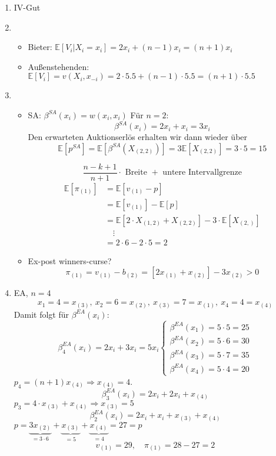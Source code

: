 \documentclass[12pt]{extreport} %
\theoremstyle{named}
\theoremstyle{nnamed}
\theoremstyle{itshape}
\theoremstyle{normal}
\begin{document}
\begin{enumerate}
	\item IV-Gut
	\item ~\
	 \begin{itemize}
		\item Bieter: $\mathds{E}[V_{i} \big| X_{i} = x_{i}] = 2 x_{i} + (n-1) x_{i} = (n+1) x_{i}$
		\item Außenstehenden: $\mathds{E}[V_{i}] = v(X_{i}, x_{-i}) = 2 \cdot 5.5 + (n-1) \cdot 5.5 = (n+1) \cdot 5.5$
	\end{itemize}
	\item ~\
		\begin{itemize}
			\item SA: $\beta^{SA}(x_{i}) = w(x_{i}, x_{i})$ Für $n = 2$:
				$$ \beta^{SA}(x_{i}) = 2x_{i} + x_{i} = 3x_{i} $$
			Den erwarteten Auktionserlös erhalten wir dann wieder über
				$$ \mathds{E}\left[ p^{SA} \right] = \mathds{E}\left[ \beta^{SA}(X_{(2,2)}) \right] = 3 \mathds{E}\left[ X_{(2,2)} \right] = 3 \cdot 5 = 15  $$
			\begin{figure*}[h!] \centering
			\end{figure*}
    				$$ \frac{n-k + 1}{n + 1} \cdot \text{ Breite } + \text{ untere Intervallgrenze} $$	
    		\begin{align*}
    			\mathds{E}[\pi_{(1)}] & = \mathds{E}[v_{(1)} - p]  \\
    			& = \mathds{E}[v_{(1)}]  - \mathds{E}[p]  \\
    			& = \mathds{E}[2 \cdot X_{(1,2)} + X_{(2,2)}]  - 3 \cdot \mathds{E}[ X_{(2,)} ]  \\
    			& \quad \vdots \\
    			& = 2 \cdot 6 - 2 \cdot 5 = 2
    		\end{align*}
			\item Ex-post winners-curse?
				$$ \pi_{(1)} = v_{(1)} - b_{(2)} = \left[ 2 x_{(1)} + x_{(2)} \right] - 3 x_{(2)} > 0 $$
		\end{itemize}
	\item EA, $n=4$
		$$ x_1 = 4 = x_{(3)}, ~x_2 = 6 = x_{(2)}, ~x_{(3)} = 7 = x_{(1)}, ~x_{4} = 4 = x_{(4)} $$
		Damit folgt für $\beta^{EA}(x_{i})$:
		$$ \beta_{4}^{EA}(x_{i}) = 2x_{i} + 3 x_{i} = 5 x_{i} \begin{cases}
			\beta^{EA}(x_{1}) = 5 \cdot 5 = 25 \\ \beta^{EA}(x_{2}) = 5 \cdot 6 = 30 \\ \beta^{EA}(x_{3}) = 5 \cdot 7 = 35 \\ \beta^{EA}(x_{4}) = 5 \cdot 4 = 20  
		\end{cases} $$
		$p_4 = (n+1) x_{(4)} \Rightarrow x_{(4)} = 4$.
			$$ \beta_{3}^{EA}(x_{i}) = 2 x_{i} + 2x_{i} + x_{(4)} $$
		$p_3 = 4 \cdot x_{(3)} + x_{(4)} \Rightarrow x_{(3)} = 5$
			$$ \beta_{2}^{EA}(x_{i}) = 2 x_{i} + x_{i} + x_{(3)} + x_{(4)} $$
		$p = \underbrace{3 x_{(2)}}_{= 3 \cdot 6} +  \underbrace{x_{(3)}}_{= 5} +  \underbrace{x_{(4)}}_{= 4} = 27 = p$
		$$ v_{(1)} = 29, \quad  \pi_{(1)} = 28 - 27 = 2 $$
\end{enumerate}
\end{document}

